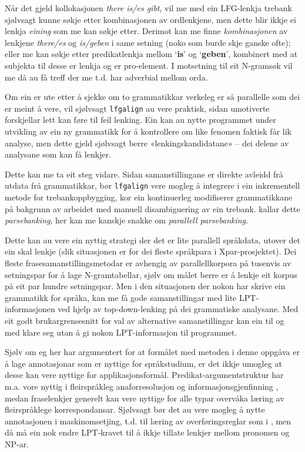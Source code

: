 \documentclass[12pt,a4paper,oneside,draft]{report}
\newcommand{\p}[1]{`\textbf{#1}'}
\begin{document}
Når det gjeld kollokasjonen \emph{there is/es gibt}, vil me med ein
 LFG-lenkja trebank sjølvsagt kunne søkje etter kombinasjonen av
 ordlenkjene, men dette blir ikkje ei lenkja \emph{eining} som me kan søkje
 etter. Derimot kan me finne \emph{kombinasjonen} av lenkjene \emph{there/es} og
 \emph{is/geben} i same setning (noko som burde skje ganske ofte); eller me
 kan søkje etter predikatlenkja mellom \p{is} og \p{geben}, kombinert
 med at subjekta til desse er lenkja og er pro-element. I motsetning
 til eit N\hyp{}gramsøk vil me då au få treff der me t.d. har
 adverbial mellom orda.

Om ein er ute etter å sjekke om to grammatikkar verkeleg er så
 parallelle som dei er meint å vere, vil sjølvsagt \texttt{lfgalign} au vere
 praktisk, sidan umotiverte forskjellar lett kan føre til feil
 lenking. Ein kan au nytte programmet under utvikling av ein ny
 grammatikk for å kontrollere om like fenomen faktisk får lik analyse,
 men dette gjeld sjølvsagt berre «lenkingskandidatane» -- dei delene
 av analysane som kan få lenkjer.

Dette kan me ta eit steg vidare. Sidan samanstillingane er direkte
 avleidd frå utdata frå grammatikkar, bør \texttt{lfgalign} vere mogleg å
 integrere i ein inkrementell metode for trebankoppbygging, kor ein
 kontinuerleg modifiserer grammatikkane på bakgrunn av arbeidet med
 manuell disambiguering av ein trebank.  \citet{rosen2007tmt} kallar
 dette \emph{parsebanking}, her kan me kanskje snakke om \emph{parallell  parsebanking}.

Dette kan au vere ein nyttig strategi der det er lite
 parallell språkdata, utover det ein skal lenkje (slik situasjonen er
 for dei fleste språkpara i Xpar-prosjektet). Dei fleste
 frasesamanstillingsmetodar er avhengig av parallellkorpora på
 tusenvis av setningspar for å lage N-gramtabellar, sjølv om målet
 berre er å lenkje eit korpus på eit par hundre setningspar. Men i den
 situasjonen der nokon har skrive ein grammatikk for språka, kan me få
 gode samanstillingar med lite LPT\hyp{}informasjonen ved hjelp av
 top-down\hyp{}lenking på dei grammatiske analysane. Med eit godt
 brukargrensesnitt for val av alternative samanstillingar kan ein til
 og med klare seg utan å gi nokon LPT\hyp{}informasjon til programmet.

Sjølv om eg her har argumentert for at formålet med metoden i denne
 oppgåva er å lage annotasjonar som er nyttige for språkstudium, er
 det ikkje umogleg at desse kan vere nyttige for
 applikasjonsformål. Predikat-argumentstruktur har m.a. vore nyttig i
 fleirspråkleg anaforresolusjon og informasjonsgjenfinning
 \citep{surdeanu2003upa,azzam1998crm}, medan fraselenkjer generelt kan
 vere nyttige for alle typar overvåka læring av fleirspråklege
 korrespondansar. Sjølvsagt bør det au vere mogleg å nytte
 annotasjonen i maskinomsetjing, t.d. til læring av overføringsreglar
 som i \citet{riezler2006gmt,graham2009fts}, men då må ein nok endre
 LPT-kravet til å ikkje tillate lenkjer mellom pronomen og NP-ar.
\end{document}
